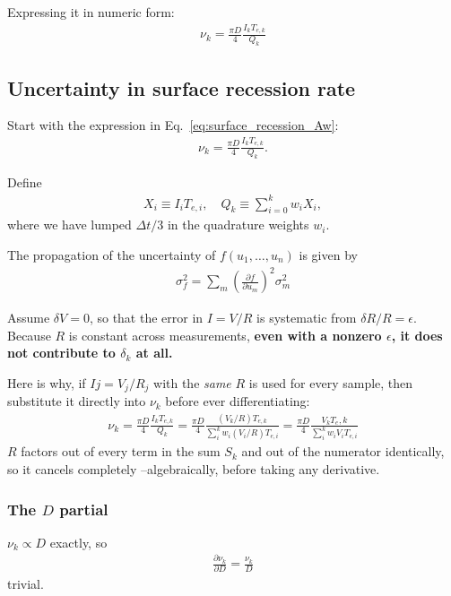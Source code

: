 \documentclass[11pt,twoside]{article}
\begin{document}
Expressing it in numeric form:
\begin{align}
    \nu_k = \frac{\pi D}{4} \frac{I_k T_{e,k}}{Q_k} 
    \label{eq:surface_recession_Aw}
\end{align}

\subsection{Uncertainty in surface recession rate}
Start with the expression in Eq.~\eqref{eq:surface_recession_Aw}:
\begin{align*}
    \nu_k = \frac{\pi D}{4} \frac{I_k T_{e,k}}{Q_k}.
\end{align*}


Define
\begin{align}
    X_i \equiv I_i T_{e,i}, \quad Q_k \equiv \sum_{i=0}^k w_i X_i, 
\end{align}
where we have lumped $\Delta t/3$ in the quadrature weights $w_i$.

The propagation of the uncertainty of $f(u_1,\ldots,u_n)$ is given by
\begin{align*}
    \sigma_f^2 = \sum_m \left(\frac{\partial f}{\partial u_m}\right)^2\sigma^2_m
\end{align*}

Assume $\delta V = 0$, so that the error in $I=V/R$ is systematic from $\delta R/R =\epsilon$. Because $R$ is constant across measurements, \textbf{even with a nonzero $\epsilon$, it does not contribute to $\delta_k$ at all.}

Here is why, if $Ij = V_j/R_j$ with the \emph{same} $R$ is used for every sample, then substitute it directly into $\nu_k$ before ever differentiating:
\begin{align*}
    \nu_k = \frac{\pi D}{4}\frac{I_k T_{e,k}}{Q_k} = \frac{\pi D}{4}\frac{(V_k/R)T_{e,k}}{\sum_{i}^kw_i(V_i/R)T_{e,i}} =  \frac{\pi D}{4} \frac{V_k T_e{,k}}{\sum_{i}^kw_iV_i T_{e,i}}
\end{align*}
$R$ factors out of every term in the sum $S_k$ and out of the numerator identically, so it cancels completely --algebraically, before taking any derivative.

\subsubsection{The $D$ partial}
$\nu_k \propto D$ exactly, so
\begin{align}
    \frac{\partial \nu_k}{\partial D} = \frac{\nu_k}{D}
    \label{eq:partial_vk_D}
\end{align}
trivial.
\end{document}
